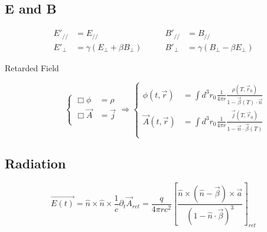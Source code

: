 \subsection{E and B}
\begin{equation}
    \label{eqn:em::sr:::E&B}
    \begin{aligned}
	E'_{//} &= E_{//}   \qquad&   B'_{//} &= B_{//}	\\
	E'_{\perp} &= \gamma (E_{\perp} + \beta B_{\perp})   \qquad& B'_{\perp} &= \gamma(B_{\perp} - \beta E_{\perp})
    \end{aligned}
\end{equation}
\begin{description}
    \item [Retarded Field]
	\begin{equation}
	    \label{eqn:em::retardedField}
	    \left\{
	    \begin{aligned}
		\Box\phi &= \rho	\\
		\Box \vec{A} &= \vec{j}	\\
	    \end{aligned}
            \right.
	    \Rightarrow
	    \left\{
	    \begin{aligned}
		\phi(t,\vec{r}) &= \int d^3r_0 \frac{1}{4\pi r}\frac{\rho(T,\vec{r}_0)}{1-\vec{\beta}(T)\cdot\vec{n}}   \\
		\vec{A}(t,\vec{r})  &= \int d^3r_0 \frac{1}{4\pi r}\frac{\vec{j}(T,\vec{r}_0)}{1-\vec{n}\cdot\vec{\beta}(T)}   \\ 
	    \end{aligned}
            \right.
	\end{equation}
\end{description}

\subsection{Radiation}
\begin{equation}
    \vec{E(t)} = \hat{n}\times\hat{n}\times\frac{1}{c}\partial_t\vec{A}_{ret} = \frac{q}{4\pi rc^2}\left[\frac{\hat{n}\times(\hat{n}-\vec{\beta})\times\vec{a}}{(1-\hat{n}\cdot\vec{\beta})^3}\right]_{ret}
\end{equation}
